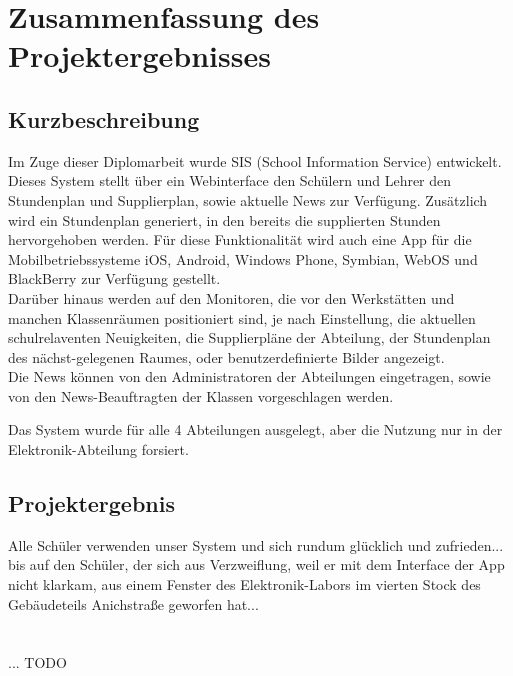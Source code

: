 \chapter[Zusammenfassung]{Zusammenfassung des Projektergebnisses}

\section{Kurzbeschreibung}
Im Zuge dieser Diplomarbeit wurde SIS (School Information Service) entwickelt. \\
Dieses System stellt über ein Webinterface den Schülern und Lehrer den Stundenplan und Supplierplan, sowie aktuelle News zur Verfügung. Zusätzlich wird ein Stundenplan generiert, in den bereits die supplierten Stunden hervorgehoben werden.
Für diese Funktionalität wird auch eine App für die Mobilbetriebssysteme iOS, Android, Windows Phone, Symbian, WebOS und BlackBerry zur Verfügung gestellt.\\
Darüber hinaus werden auf den Monitoren, die vor den Werkstätten und manchen Klassenräumen positioniert sind, je nach Einstellung, die aktuellen schulrelaventen Neuigkeiten, die Supplierpläne der Abteilung, der Stundenplan des nächst-gelegenen Raumes, oder benutzerdefinierte Bilder angezeigt.\\
Die News können von den Administratoren der Abteilungen eingetragen, sowie von den News-Beauftragten der Klassen vorgeschlagen werden.


Das System wurde für alle 4 Abteilungen ausgelegt, aber die Nutzung nur in der Elektronik-Abteilung forsiert.

\section{Projektergebnis}
Alle Schüler verwenden unser System und sich rundum glücklich und zufrieden... bis auf den Schüler, der sich aus Verzweiflung, weil er mit dem Interface der App nicht klarkam, aus einem Fenster des Elektronik-Labors im vierten Stock des Gebäudeteils Anichstraße geworfen hat...\\
\\
\\... TODO